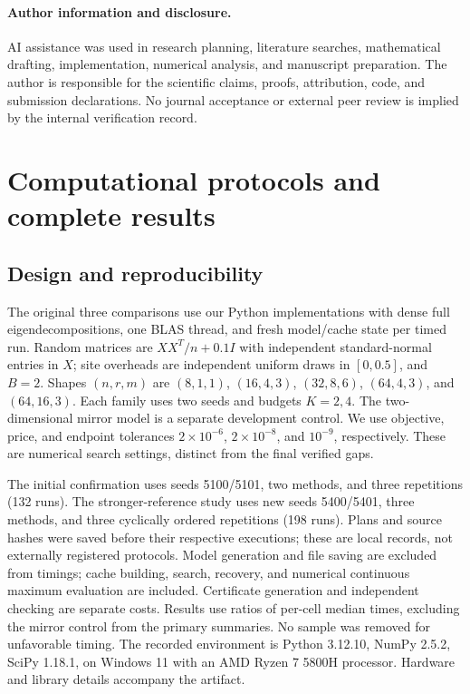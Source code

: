 \documentclass[11pt]{article}
\begin{document}
\paragraph{Author information and disclosure.}
AI assistance was used in
research planning, literature searches, mathematical drafting, implementation,
numerical analysis, and manuscript preparation. The author is responsible
for the scientific claims, proofs,
attribution, code, and submission declarations. No journal acceptance or
external peer review is implied by the internal verification record.

\appendix
\section{Computational protocols and complete results}\label{app:experiments}
\subsection{Design and reproducibility}
The original three comparisons use our Python implementations with dense full
eigendecompositions, one BLAS thread, and fresh model/cache state per timed
run. Random matrices are $XX^T/n+0.1I$ with independent standard-normal
entries in $X$; site overheads are independent uniform draws in $[0,0.5]$,
and $B=2$. Shapes $(n,r,m)$ are $(8,1,1)$, $(16,4,3)$, $(32,8,6)$,
$(64,4,3)$, and $(64,16,3)$. Each family uses two seeds and budgets $K=2,4$.
The two-dimensional mirror model is a separate development control.
We use objective, price, and endpoint tolerances $2\times10^{-6}$,
$2\times10^{-8}$, and $10^{-9}$, respectively. These are numerical search
settings, distinct from the final verified gaps.

The initial confirmation uses seeds 5100/5101, two methods, and three
repetitions (132 runs). The stronger-reference study uses new seeds
5400/5401, three methods, and three cyclically ordered repetitions
(198 runs). Plans and source hashes were saved before their respective
executions; these are local records, not externally registered protocols.
Model generation and file saving are excluded from timings; cache building,
search, recovery, and numerical continuous maximum evaluation are included.
Certificate generation and independent checking are separate costs.
Results use ratios of per-cell median times, excluding the mirror control
from the primary summaries. No sample was removed for unfavorable timing.
The recorded environment is Python 3.12.10, NumPy 2.5.2, SciPy 1.18.1, on
Windows 11 with an AMD Ryzen 7 5800H processor. Hardware and library details
accompany the artifact.
\end{document}
